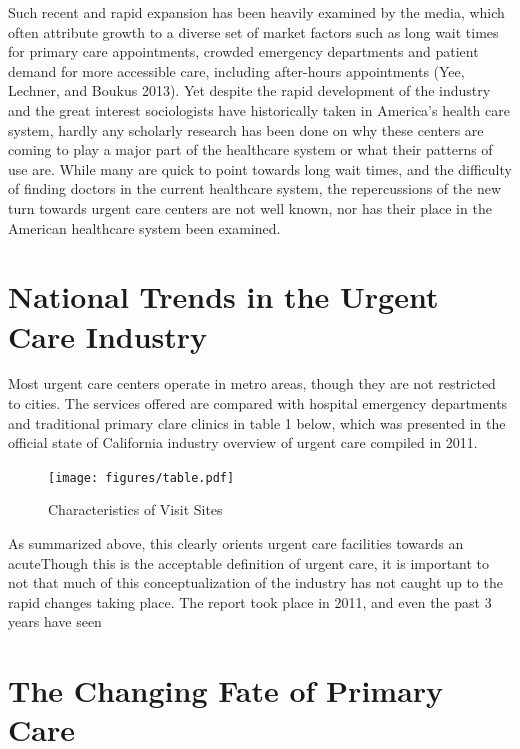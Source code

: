 \documentclass[12pt,twoside]{reedthesis}
\begin{document}
  Such recent and rapid expansion has been heavily examined by the media,
  which often attribute growth to a diverse set of market factors such as
  long wait times for primary care appointments, crowded emergency
  departments and patient demand for more accessible care, including
  after-hours appointments (Yee, Lechner, and Boukus 2013). Yet despite
  the rapid development of the industry and the great interest
  sociologists have historically taken in America's health care system,
  hardly any scholarly research has been done on why these centers are
  coming to play a major part of the healthcare system or what their
  patterns of use are. While many are quick to point towards long wait
  times, and the difficulty of finding doctors in the current healthcare
  system, the repercussions of the new turn towards urgent care centers
  are not well known, nor has their place in the American healthcare
  system been examined.
  
  \section{National Trends in the Urgent Care
  Industry}\label{national-trends-in-the-urgent-care-industry}
  
  Most urgent care centers operate in metro areas, though they are not
  restricted to cities. The services offered are compared with hospital
  emergency departments and traditional primary clare clinics in table 1
  below, which was presented in the official state of California industry
  overview of urgent care compiled in 2011. \newpage
  
  \begin{figure}[htbp]
  \centering
  \texttt{[image: figures/table.pdf]}
  \caption[Characteristics of Visit Sites]{\normalsize{Characteristics of Visit Sites}}
  \label{fig:tab1}
  \end{figure}
  
  As summarized above, this clearly orients urgent care facilities towards
  an acuteThough this is the acceptable definition of urgent care, it is
  important to not that much of this conceptualization of the industry has
  not caught up to the rapid changes taking place. The report took place
  in 2011, and even the past 3 years have seen
  
  \section{The Changing Fate of Primary
  Care}\label{the-changing-fate-of-primary-care}
  
\end{document}
